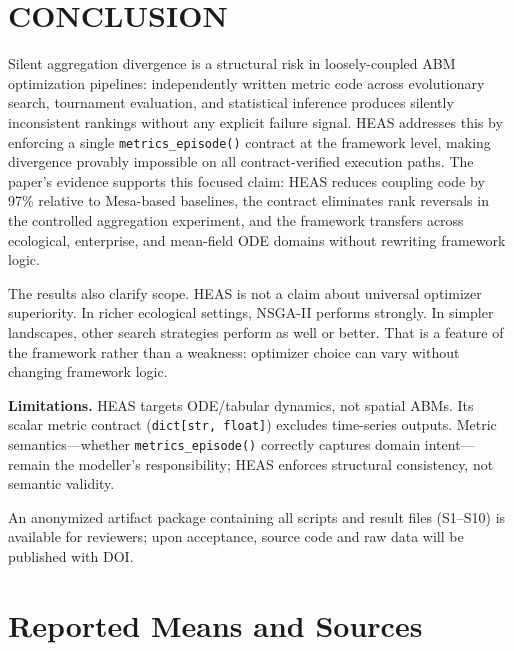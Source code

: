 \documentclass{wscpaperproc}
\begin{document}
\section{CONCLUSION}

Silent aggregation divergence is a structural risk in loosely-coupled ABM
optimization pipelines: independently written metric code across evolutionary
search, tournament evaluation, and statistical inference produces silently
inconsistent rankings without any explicit failure signal. HEAS addresses this
by enforcing a single \texttt{metrics\_episode()} contract at the framework
level, making divergence provably impossible on all contract-verified execution
paths. The paper's evidence supports this focused claim: HEAS reduces coupling
code by 97\% relative to Mesa-based baselines, the contract eliminates rank
reversals in the controlled aggregation experiment, and the framework transfers
across ecological, enterprise, and mean-field ODE domains without rewriting
framework logic.

The results also clarify scope. HEAS is not a claim about universal optimizer
superiority. In richer ecological settings, NSGA-II performs strongly. In
simpler landscapes, other search strategies perform as well or better. That is
a feature of the framework rather than a weakness: optimizer choice can vary
without changing framework logic.

\textbf{Limitations.} HEAS targets ODE/tabular dynamics, not spatial ABMs. Its
scalar metric contract (\texttt{dict[str, float]}) excludes time-series outputs.
Metric semantics---whether \texttt{metrics\_episode()} correctly captures domain
intent---remain the modeller's responsibility; HEAS enforces structural
consistency, not semantic validity.

An anonymized artifact package containing all scripts and result files (S1--S10)
is available for reviewers; upon acceptance, source code and raw data will be
published with DOI.

\appendix
\section{Reported Means and Sources}
\end{document}
